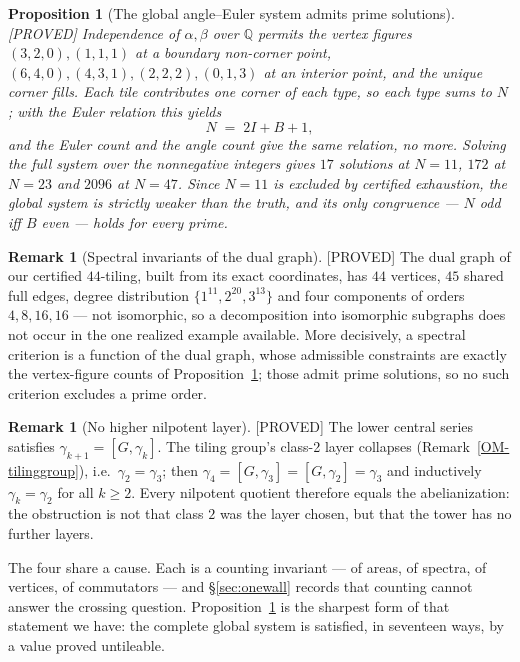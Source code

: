 \documentclass[11pt,reqno]{amsart}
\theoremstyle{plain}
\newtheorem{proposition}[theorem]{Proposition}
\theoremstyle{definition}
\newtheorem{remark}[theorem]{Remark}
\newcommand{\lab}[1]{\hfill\textnormal{\footnotesize\textsc{[#1]}}}
\begin{document}
\begin{proposition}[The global angle--Euler system admits prime solutions]\label{prop:globalsys}\lab{PROVED}
Independence of $\alpha,\beta$ over $\mathbb Q$ permits the vertex figures $(3,2,0),(1,1,1)$ at a
boundary non-corner point, $(6,4,0),(4,3,1),(2,2,2),(0,1,3)$ at an interior point, and the unique
corner fills. Each tile contributes one corner of each type, so each type sums to $N$; with the
Euler relation this yields
\[
  N \;=\; 2I + B + 1 ,
\]
and the Euler count and the angle count give \emph{the same} relation, no more. Solving the full
system over the nonnegative integers gives $17$ solutions at $N=11$, $172$ at $N=23$ and $2096$ at
$N=47$. Since $N=11$ is excluded by certified exhaustion, the global system is strictly weaker than
the truth, and its only congruence --- $N$ odd iff $B$ even --- holds for every prime.
\end{proposition}

\begin{remark}[Spectral invariants of the dual graph]\label{rem:spectral}\lab{PROVED}
The dual graph of our certified $44$-tiling, built from its exact coordinates, has $44$ vertices,
$45$ shared full edges, degree distribution $\{1^{11},2^{20},3^{13}\}$ and four components of
orders $4,8,16,16$ --- not isomorphic, so a decomposition into isomorphic subgraphs does not occur
in the one realized example available. More decisively, a spectral criterion is a function of the
dual graph, whose admissible constraints are exactly the vertex-figure counts of
Proposition~\ref{prop:globalsys}; those admit prime solutions, so no such criterion excludes a
prime order.
\end{remark}

\begin{remark}[No higher nilpotent layer]\label{rem:nilptower}\lab{PROVED}
The lower central series satisfies $\gamma_{k+1}=[G,\gamma_k]$. The tiling group's class-2 layer
collapses (Remark~\ref{OM-tilinggroup}), i.e.\ $\gamma_2=\gamma_3$; then
$\gamma_4=[G,\gamma_3]=[G,\gamma_2]=\gamma_3$ and inductively $\gamma_k=\gamma_2$ for all $k\ge2$.
Every nilpotent quotient therefore equals the abelianization: the obstruction is not that class $2$
was the layer chosen, but that the tower has no further layers.
\end{remark}

The four share a cause. Each is a counting invariant --- of areas, of spectra, of vertices, of
commutators --- and \S\ref{sec:onewall} records that counting cannot answer the crossing question.
Proposition~\ref{prop:globalsys} is the sharpest form of that statement we have: the complete
global system is satisfied, in seventeen ways, by a value proved untileable.
\end{document}
